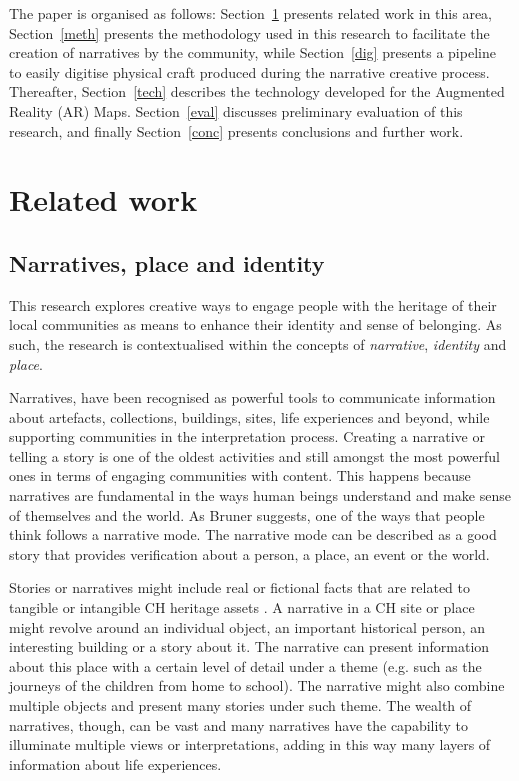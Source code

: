 \documentclass[acmlarge,screen,dvipsnames]{acmart}
\begin{document}
The paper is organised as follows: Section~\ref{ref} presents related
work in this area, Section~\ref{meth} presents the methodology used in
this research to facilitate the creation of narratives by the community,
while Section~\ref{dig} presents a pipeline to easily digitise physical
craft produced during the narrative creative process. Thereafter,
Section~\ref{tech} describes the technology developed for the Augmented
Reality (AR) Maps. Section~\ref{eval} discusses preliminary evaluation
of this research, and finally Section~\ref{conc} presents conclusions
and further work.


\section{Related work} 
\label{ref}
\subsection{Narratives, place and identity}
This research explores creative ways to engage people with the heritage of their local communities as means to enhance their identity and sense of belonging. As such, the research is contextualised within the concepts of \emph{narrative}, \emph{identity} and \emph{place}.

Narratives, have been recognised as powerful tools to communicate information about artefacts, collections, buildings, sites, life experiences and beyond, while supporting communities in the interpretation process\cite{Kelly2010,Pine2007}. Creating a narrative or telling a story is one of the oldest activities and still amongst the most powerful ones in terms of engaging communities with content. This happens because narratives are fundamental in the ways human beings understand and make sense of themselves and the world. As Bruner \cite{Bruner1986} suggests, one of the ways that people think follows a narrative mode. The narrative mode can be described as a good story that provides verification about a person, a place, an event or the world.

Stories or narratives might include real or fictional facts that are related to tangible or intangible CH heritage assets \cite{HandlerMiller2004}. A narrative in a CH site or place might revolve around an individual object, an important historical person, an interesting building or a story about it. The narrative can present information about this place with a certain level of detail under a theme (e.g. such as the journeys of the children from home to school). The narrative might also combine multiple objects and present many stories under such theme. The wealth of narratives, though, can be vast and many narratives have the capability to illuminate multiple views or interpretations, adding in this way many layers of information about life experiences.
\end{document}
